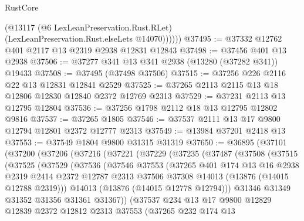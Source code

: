 \begin{lexlean}{RustCore}
\begin{coremodule}
            (@13117
              (@6 LexLeanPreservation.Rust.RLet)
              (LexLeanPreservation.Rust.elseLets @14070))))))
@37495 := @37332 @12762 @401 @2117 @13 @2319 @2938 @12831 @12843
@37498 := @37456 @401 @13 @2938
@37506 := @37277 @341 @13 @341 @2938 (@13280 (@37282 @341)) @19433
@37508 := @37495 (@37498 @37506)
@37515 := @37256 @226 @2116 @22 @13 @12831 @12841 @2529
@37525 := @37265 @2113 @2115 @13 @18 @12806 @12830 @12840 @2372 @12769 @2313
@37529 := @37231 @2113 @13 @12795 @12804
@37536 := @37256 @1798 @2112 @18 @13 @12795 @12802 @9816
@37537 := @37265 @1805
@37546 := @37537 @2111 @13 @17 @9800 @12794 @12801 @2372 @12777 @2313
@37549 := @13984 @37201 @2418 @13
@37553 := @37549 @1804 @9800 @31315 @31319
@37650 := @36895
    (@37101
      (@37200
        (@37206
          (@37216
            (@37221
              (@37229
                (@37235
                  (@37487
                    (@37508
                      (@37515
                        (@37525
                          (@37529
                            (@37536
                              (@37546
                                @37553
                                (@37265
                                  @401
                                  @174
                                  @13
                                  @16
                                  @2938
                                  @2319
                                  @2414
                                  @2372
                                  @12787
                                  @2313
                                  @37506
                                  @37308
                                  @14013
                                  (@13876 (@14015 @12788 @2319)))
                                @14013
                                (@13876 (@14015 @12778 @12794)))
                              @31346
                              @31349
                              @31352
                              @31356
                              @31361
                              @31367))
                          (@37537
                            @234
                            @13
                            @17
                            @9800
                            @12829
                            @12839
                            @2372
                            @12812
                            @2313
                            @37553
                            (@37265
                              @232
                              @174
                              @13

\end{coremodule}
\end{lexlean}
